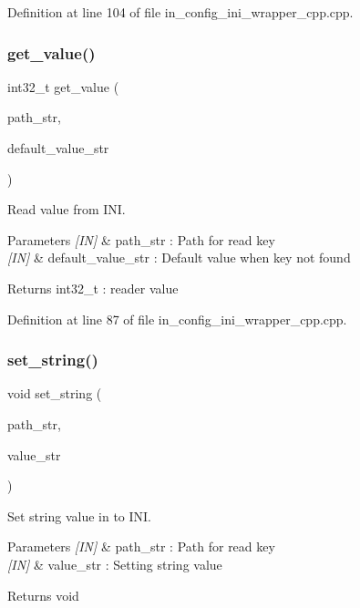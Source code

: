 Definition at line 104 of file in\+\_\+config\+\_\+ini\+\_\+wrapper\+\_\+cpp.\+cpp.

\mbox{\label{group__configuration_ga580850f1f2491b81525d7e80fac03d89}} 
\subsubsection{get\_value()}
{\footnotesize\ttfamily int32\+\_\+t get\+\_\+value (\begin{DoxyParamCaption}\item[{wx\+String}]{path\+\_\+str,  }\item[{wx\+String}]{default\+\_\+value\+\_\+str }\end{DoxyParamCaption})}



Read value from I\+NI. 


\begin{DoxyParams}{Parameters}
{\em \mbox{[}\+I\+N\mbox{]}} & path\+\_\+str \+: Path for read key \\
\hline
{\em \mbox{[}\+I\+N\mbox{]}} & default\+\_\+value\+\_\+str \+: Default value when key not found \\
\hline
\end{DoxyParams}
\begin{DoxyReturn}{Returns}
int32\+\_\+t \+: reader value 
\end{DoxyReturn}


Definition at line 87 of file in\+\_\+config\+\_\+ini\+\_\+wrapper\+\_\+cpp.\+cpp.

\mbox{\label{group__configuration_gab350eb4d8010ec0f4a153c826fa1bd96}} 
\subsubsection{set\_string()}
{\footnotesize\ttfamily void set\+\_\+string (\begin{DoxyParamCaption}\item[{wx\+String}]{path\+\_\+str,  }\item[{wx\+String}]{value\+\_\+str }\end{DoxyParamCaption})}



Set string value in to I\+NI. 


\begin{DoxyParams}{Parameters}
{\em \mbox{[}\+I\+N\mbox{]}} & path\+\_\+str \+: Path for read key \\
\hline
{\em \mbox{[}\+I\+N\mbox{]}} & value\+\_\+str \+: Setting string value \\
\hline
\end{DoxyParams}
\begin{DoxyReturn}{Returns}
void 
\end{DoxyReturn}


